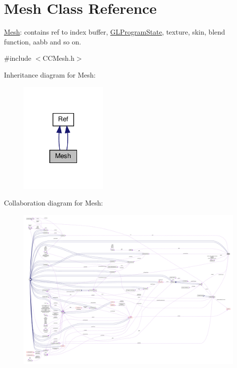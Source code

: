 \hypertarget{classMesh}{}\section{Mesh Class Reference}
\label{classMesh}


\hyperlink{classMesh}{Mesh}\+: contains ref to index buffer, \hyperlink{classGLProgramState}{G\+L\+Program\+State}, texture, skin, blend function, aabb and so on.  




{\ttfamily \#include $<$C\+C\+Mesh.\+h$>$}



Inheritance diagram for Mesh\+:
\nopagebreak
\begin{figure}[H]
\begin{center}
\leavevmode
\includegraphics[width=121pt]{classMesh__inherit__graph}
\end{center}
\end{figure}


Collaboration diagram for Mesh\+:
\nopagebreak
\begin{figure}[H]
\begin{center}
\leavevmode
\includegraphics[width=350pt]{classMesh__coll__graph}
\end{center}
\end{figure}
